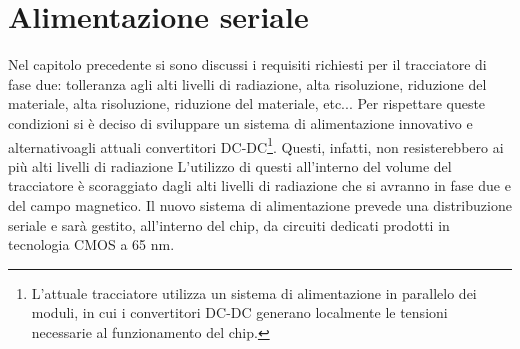 \chapter{Alimentazione seriale}
Nel capitolo precedente si sono discussi i requisiti richiesti per il tracciatore di fase due: tolleranza agli alti livelli di radiazione, alta risoluzione, riduzione del materiale, alta risoluzione, riduzione del materiale, etc... Per rispettare queste condizioni si è deciso di sviluppare un sistema di alimentazione innovativo e alternativoagli attuali convertitori DC-DC\footnote{L'attuale tracciatore utilizza un sistema di alimentazione in parallelo dei moduli, in cui i convertitori DC-DC generano localmente le tensioni necessarie al funzionamento del chip.}. 
Questi, infatti, non resisterebbero ai più alti livelli di radiazione L'utilizzo di questi all'interno del volume del tracciatore è scoraggiato  dagli alti livelli di radiazione che si avranno in fase due e del campo magnetico. 
Il nuovo sistema di alimentazione  prevede una distribuzione seriale e sarà gestito, all'interno del chip, da circuiti dedicati prodotti in tecnologia CMOS a 65 nm.


